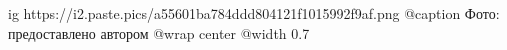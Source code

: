  
 
 
 
 

\ifcmt
  ig https://i2.paste.pics/a55601ba784ddd804121f1015992f9af.png
	@caption Фото: предоставлено автором
  @wrap center
  @width 0.7
\fi
